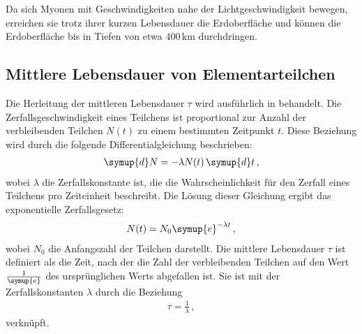 Da sich Myonen mit Geschwindigkeiten nahe der Lichtgeschwindigkeit bewegen, erreichen sie trotz ihrer kurzen Lebensdauer die Erdoberfläche 
und können die Erdoberfläche bis in Tiefen von etwa $400\,\unit{\kilo\meter}$ durchdringen.

\subsection{Mittlere Lebensdauer von Elementarteilchen}
Die Herleitung der mittleren Lebensdauer $\tau$ wird ausführlich in \cite{Techniques} behandelt. Die Zerfallsgeschwindigkeit eines Teilchens 
ist proportional zur Anzahl der verbleibenden Teilchen $N(t)$ zu einem bestimmten Zeitpunkt $t$. Diese Beziehung wird durch die folgende 
Differentialgleichung beschrieben:
\begin{align}
\symup{d}N = -\lambda N(t)\,\symup{d}t \,, %
\end{align}
wobei $\lambda$ die Zerfallskonstante ist, die die Wahrscheinlichkeit für den Zerfall eines Teilchens pro Zeiteinheit beschreibt. 
Die Lösung dieser Gleichung ergibt das exponentielle Zerfallsgesetz:
\begin{align}
N(t) = N_0 \symup{e}^{-\lambda t} \,, \label{eqn:Zerfallsgesetz}
\end{align}
wobei $N_0$ die Anfangszahl der Teilchen darstellt. Die mittlere Lebensdauer $\tau$ ist definiert als die Zeit, nach der die Zahl der 
verbleibenden Teilchen auf den Wert $\frac{1}{\symup{e}}$ des ursprünglichen Werts abgefallen ist. Sie ist mit der Zerfallskonstanten $\lambda$ durch die Beziehung
\begin{align}
\tau = \frac{1}{\lambda}\,, \label{eqn:tau}
\end{align}
verknüpft.

